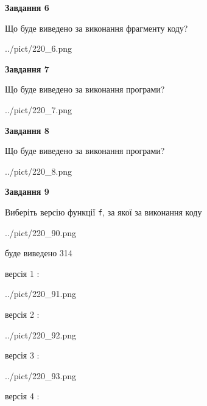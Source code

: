 \documentclass[12pt, ukrainian]{article}
\def\code#1{\Verb!#1!}
\begin{document}
{\begin {large}
{\begin {center}\textbf{Завдання 6}\end {center}}

Що буде виведено за виконання фрагменту коду?\par
\begin{center}
	{../pict/220_6.png}
\end{center}
\newpage

{\begin {center}\textbf{Завдання 7}\end {center}}

Що буде виведено за виконання програми?\par
\begin{center}
	{../pict/220_7.png}
\end{center}
\newpage

{\begin {center}\textbf{Завдання 8}\end {center}}

Що буде виведено за виконання програми?\par
\begin{center}
	{../pict/220_8.png}
\end{center}
\newpage

{\begin {center}\textbf{Завдання 9}\end {center}}

Виберіть версію функції \code{f}, за якої за виконання коду
\begin{center}
	{../pict/220_90.png}
\end{center}
буде виведено 314

\vspace{5mm}
версія 1 :

\begin{center}
	{../pict/220_91.png}
\end{center}
версія 2 :

\begin{center}
	{../pict/220_92.png}
\end{center}
версія 3 :

\begin{center}
	{../pict/220_93.png}
\end{center}
версія 4 :


\end{large}}
\end{document}
